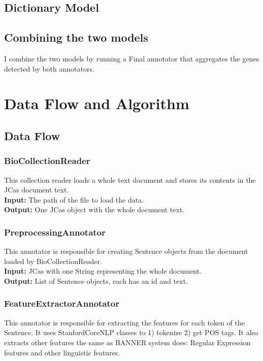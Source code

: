 \documentclass{article}
\begin{document}
\subsection{Dictionary Model}

\subsection{Combining the two models}
I combine the two models by running a Final annotator that aggregates the genes detected by both annotators. 
\section{Data Flow and Algorithm}
\subsection{Data Flow}
\subsubsection{BioCollectionReader}
This collection reader loads a whole text document and stores its contents in the JCas document text.\\
\textbf{Input:} The path of the file to load the data.\\
\textbf{Output:} One JCas object with the whole document text.


\subsubsection{PreprocessingAnnotator}
This annotator is responsible for creating Sentence objects from the document loaded by BioCollectionReader.\\
\textbf{Input:} JCas with one String representing the whole document.\\
\textbf{Output:} List of Sentence objects, each has an id and text.\\


\subsubsection{FeatureExtractorAnnotator}
This annotator is responsible for extracting the features for each token of the Sentence. It uses StanfordCoreNLP classes to 1) tokenize 2) get POS tags. It also extracts other features the same as BANNER \cite{banner_code} system does: Regular Expression features and other linguistic features.\\
\end{document}

